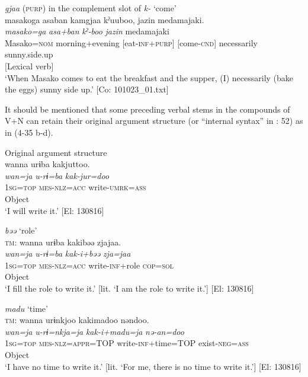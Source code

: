 \ex \textit{gjaa} (\textsc{purp}) in the complement slot of \textit{k-} ‘come’\\
\gllll masakoga  {\textbar}asaban{\textbar}  kamgjaa  kˀuuboo,  jazin   {\textbar}medamajaki{\textbar}.\\
      \textit{masako=ga}  \textit{asa+ban}  \textit{}  \textit{kˀ-boo}  \textit{jazin} medamajaki\\                                                                                                
      Masako=\textsc{nom}  morning+evening  [eat-\textsc{inf}+\textsc{purp}]  [come-\textsc{cnd}]  necessarily                       sunny.side.up\\
          [Complement]  [Lexical verb]\\
\glt  ‘When Masako comes to eat the breakfast and the supper, (I) necessarily (bake the eggs) sunny side up.’   [Co: 101023\_01.txt]
\z
\z

It should be mentioned that some preceding verbal stems in the compounds of V+N can retain their original argument structure (or “internal syntax” in \citealt{Haspelmath1996}: 52) as in (4-35 b-d).

\ea  
\ea Original argument structure \label{ex:4.35}\\
\gllll  wanna  urɨba  kakjuttoo.\\
    \textit{wan=ja}  \textit{u-rɨ=ba}  \textit{kak-jur=doo}\\
    1\textsc{sg}=\textsc{top}  \textsc{mes}-\textsc{nlz}=\textsc{acc}  write-\textsc{umrk}=\textsc{ass}\\
      Object  \\
    \glt     ‘I will write it.’ [El: 130816]

\ex \textit{bəə} ‘role’\\
\gllll  \textsc{tm}:  wanna  urɨba  kakibəə  zjajaa.\\
    \textit{wan=ja}  \textit{u-rɨ=ba}  \textit{kak-i+bəə}  \textit{zja=jaa}\\
    1\textsc{sg}=\textsc{top}  \textsc{mes}-\textsc{nlz}=\textsc{acc}  write-\textsc{inf}+role  \textsc{cop}=\textsc{sol}\\
     {} Object  \\
    \glt     ‘I fill the role to write it.’ [lit. ‘I am the role to write it.’] [El: 130816]

\ex \textit{madu} ‘time’\\
\gllll  \textsc{tm}:  wanna  urɨnkjoo  kakimadoo  nəndoo.\\
    \textit{wan=ja}  \textit{u-rɨ=nkja=ja}  \textit{kak-i+madu=ja}  \textit{nə-an=doo}\\
    1\textsc{sg}=\textsc{top}  \textsc{mes}-\textsc{nlz}=\textsc{appr}=TOP  write-\textsc{inf}+time=TOP  exist-\textsc{neg}=\textsc{ass}\\
      Object    \\
    \glt     ‘I have no time to write it.’ [lit. ‘For me, there is no time to write it.’] [El: 130816]

